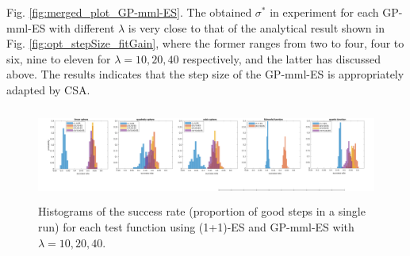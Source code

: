 Fig. \ref{fig:merged_plot_GP-mml-ES}. The obtained $\sigma^*$ in experiment for each GP-mml-ES with different $\lambda$ is very close to that of the analytical result shown in Fig. \ref{fig:opt_stepSize_fitGain}, where the former ranges from two to four, four to six, nine to eleven for $\lambda=10,20,40$ respectively, and the latter has discussed above. The results indicates that the step size of the GP-mml-ES is appropriately adapted by CSA. 




\begin{center}
\begin{figure}
\includegraphics[height=1.2in, width=6in]{success_NO_emergency_v3_final.pdf}
\caption{Histograms of the success rate (proportion of good steps in a single run) for each test function using (1+1)-ES and GP-mml-ES with $\lambda=10,20,40$. 
}
\label{fig:success_plot_GP-mml-ES}


\end{figure}
\end{center}



